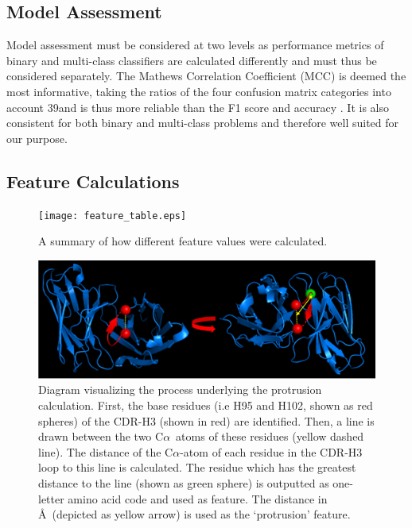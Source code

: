 \documentclass[12pt]{article}
\newcommand{\ca}{\mbox{C$\alpha$}}
\begin{document}
\subsection{Model Assessment} 
Model assessment must be considered at two levels as performance
metrics of binary and multi-class classifiers are calculated
differently and must thus be considered separately. The Mathews
Correlation Coefficient (MCC)\cite{Matthews1975} is deemed the most
informative, taking the ratios of the four confusion matrix categories
into account 39and is thus more reliable than the F1 score and
accuracy . It is also consistent for both binary and multi-class
problems and therefore well suited for our purpose.
 
\subsection{Feature Calculations}
\begin{figure}
  \centering
  \texttt{[image: feature\_table.eps]}
  \caption {A summary of how different feature values were calculated.}
  \label{fig:feature_table}
\end{figure}

\begin{figure}
  \includegraphics[scale=0.6]{angle.eps}
  \caption {Diagram visualizing the process underlying the protrusion
    calculation. First, the base residues (i.e H95 and H102, shown as
    red spheres) of the CDR-H3 (shown in red) are identified. Then, a
    line is drawn between the two \ca\ atoms of these residues (yellow
    dashed line). The distance of the \ca-atom of each residue in the
    CDR-H3 loop to this line is calculated. The residue which has the
    greatest distance to the line (shown as green sphere) is outputted
    as one-letter amino acid code and used as feature. The distance in
    \AA\ (depicted as yellow arrow) is used as the `protrusion'
    feature. }
  \label{fig:angle}
\end{figure}
\end{document}
